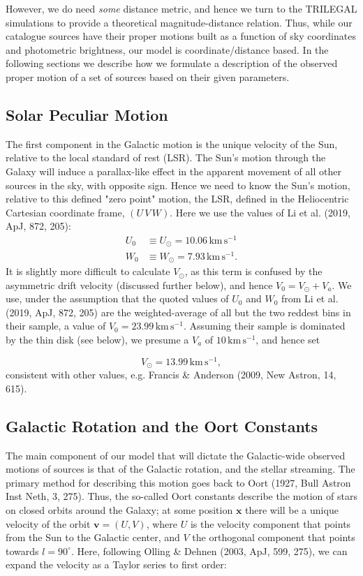 \documentclass[fleqn,usenatbib]{mnras}
\begin{document}
However, we do need \textit{some} distance metric, and hence we turn to the TRILEGAL simulations \citep{Girardi2005} to provide a theoretical magnitude-distance relation. Thus, while our catalogue sources have their proper motions built as a function of sky coordinates and photometric brightness, our model is coordinate/distance based. In the following sections we describe how we formulate a description of the observed proper motion of a set of sources based on their given parameters.

\subsection{Solar Peculiar Motion}
The first component in the Galactic motion is the unique velocity of the Sun, relative to the local standard of rest (LSR). The Sun's motion through the Galaxy will induce a parallax-like effect in the apparent movement of all other sources in the sky, with opposite sign. Hence we need to know the Sun's motion, relative to this defined "zero point" motion, the LSR, defined in the Heliocentric Cartesian coordinate frame, $(U\,V\,W)$. Here we use the values of Li et al. (2019, ApJ, 872, 205):
\begin{align}
    U_0 &\equiv U_\odot = 10.06\,\mathrm{km}\,\mathrm{s}^{-1} \\
    W_0 &\equiv W_\odot = 7.93\,\mathrm{km}\,\mathrm{s}^{-1}.
\end{align}
It is slightly more difficult to calculate $V_\odot$, as this term is confused by the asymmetric drift velocity (discussed further below), and hence $V_0 = V_\odot + V_a$. We use, under the assumption that the quoted values of $U_0$ and $W_0$ from Li et al. (2019, ApJ, 872, 205) are the weighted-average of all but the two reddest bins in their sample, a value of $V_0 = 23.99\,\mathrm{km}\,\mathrm{s}^{-1}$. Assuming their sample is dominated by the thin disk (see below), we presume a $V_a$ of $10\,\mathrm{km}\,\mathrm{s}^{-1}$, and hence set

\begin{equation}
    V_\odot = 13.99\,\mathrm{km}\,\mathrm{s}^{-1},
\end{equation}
consistent with other values, e.g. Francis \& Anderson (2009, New Astron, 14, 615).

\subsection{Galactic Rotation and the Oort Constants}
The main component of our model that will dictate the Galactic-wide observed motions of sources is that of the Galactic rotation, and the stellar streaming. The primary method for describing this motion goes back to Oort (1927, Bull Astron Inst Neth, 3, 275). Thus, the so-called Oort constants describe the motion of stars on closed orbits around the Galaxy; at some position $\bm{x}$ there will be a unique velocity of the orbit $\bm{v} = (U, V)$, where $U$ is the velocity component that points from the Sun to the Galactic center, and $V$ the orthogonal component that points towards $l = 90^\circ$. Here, following Olling \& Dehnen (2003, ApJ, 599, 275), we can expand the velocity as a Taylor series to first order:
\end{document}
